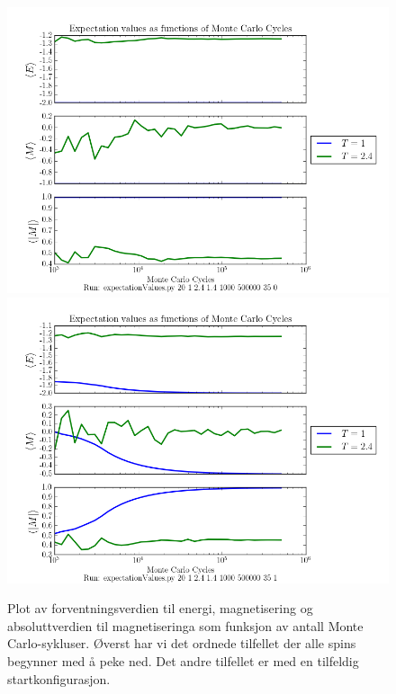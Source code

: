 \documentclass[11pt, twocolumn]{article}
\begin{document}
\begin{figure}[ht]
  \centering
  \includegraphics[scale=0.7]{../fig/E_M_Mabs.png}
  \includegraphics[scale=0.7]{../fig/E_M_Mabs_random.png}
  \caption{Plot av forventningsverdien til energi,
    magnetisering og absoluttverdien til magnetiseringa som funksjon av antall Monte Carlo-sykluser. 
    Øverst har vi det ordnede tilfellet der alle spins begynner med å peke ned. Det andre tilfellet er 
    med en tilfeldig startkonfigurasjon.}
\label{fig:forventningsverdi}
\end{figure}
\end{document}
